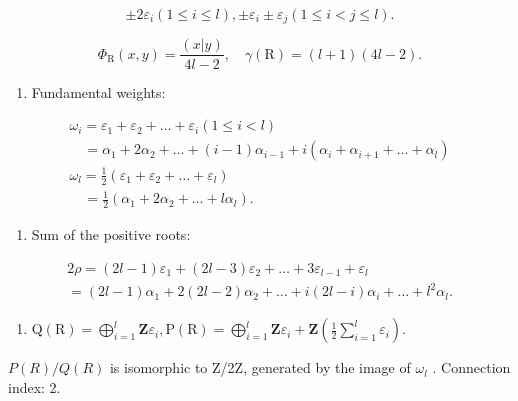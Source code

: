 \[
\pm 2 \varepsilon_ {i} (1 \leqslant i \leqslant l), \pm \varepsilon_ {i} \pm \varepsilon_ {j} (1 \leqslant i <   j \leqslant l).
\]

\[
\Phi_ {\mathrm{R}} (x, y) = \frac {(x | y)}{4 l - 2}, \quad \gamma (\mathrm{R}) = (l + 1) (4 l - 2).
\]

\begin{enumerate}
\def\labelenumi{(\Roman{enumi})}
\setcounter{enumi}{5}
\tightlist
\item
  Fundamental weights:
\end{enumerate}

\[
\begin{array}{l} \omega_ {i} = \varepsilon_ {1} + \varepsilon_ {2} + \dots + \varepsilon_ {i} (1 \leqslant i <   l) \\ \quad = \alpha_ {1} + 2 \alpha_ {2} + \dots + (i - 1) \alpha_ {i - 1} + i (\alpha_ {i} + \alpha_ {i + 1} + \dots + \alpha_ {l}) \\ \omega_ {l} = \frac {1}{2} (\varepsilon_ {1} + \varepsilon_ {2} + \dots + \varepsilon_ {l}) \\ \quad = \frac {1}{2} (\alpha_ {1} + 2 \alpha_ {2} + \dots + l \alpha_ {l}). \end{array}
\]

\begin{enumerate}
\def\labelenumi{(\Roman{enumi})}
\setcounter{enumi}{6}
\tightlist
\item
  Sum of the positive roots:
\end{enumerate}

\[
\begin{array}{l} 2 \rho = (2 l - 1) \varepsilon_ {1} + (2 l - 3) \varepsilon_ {2} + \dots + 3 \varepsilon_ {l - 1} + \varepsilon_ {l} \\ = (2 l - 1) \alpha_ {1} + 2 (2 l - 2) \alpha_ {2} + \dots + i (2 l - i) \alpha_ {i} + \dots + l ^ {2} \alpha_ {l}. \end{array}
\]

\begin{enumerate}
\def\labelenumi{(\Roman{enumi})}
\setcounter{enumi}{7}
\tightlist
\item
  \(\mathrm{Q}(\mathrm{R}) = \bigoplus_{i=1}^{l}\mathbf{Z}\varepsilon_i,\mathrm{P}(\mathrm{R}) = \bigoplus_{i=1}^{l}\mathbf{Z}\varepsilon_i + \mathbf{Z}(\frac{1}{2}\sum_{i=1}^{l}\varepsilon_i).\)
\end{enumerate}

\(P(R)/Q(R)\) is isomorphic to Z/2Z, generated by the image of \(\omega_{l}\) . Connection index: 2.

